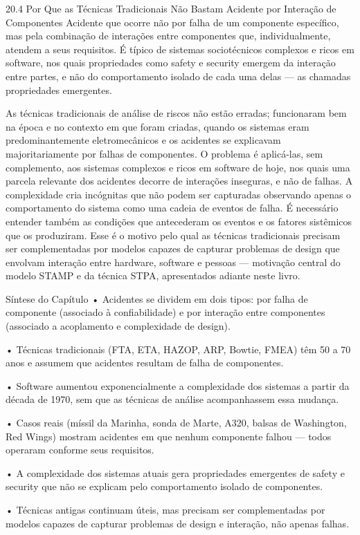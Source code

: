 20.4 Por Que as Técnicas Tradicionais Não Bastam Acidente por Interação de Componentes Acidente que ocorre não por falha de um componente específico, mas pela combinação de interações entre componentes que, individualmente, atendem a seus requisitos. É típico de sistemas sociotécnicos complexos e ricos em software, nos quais propriedades como safety e security emergem da interação entre partes, e não do comportamento isolado de cada uma delas — as chamadas propriedades emergentes.

As técnicas tradicionais de análise de riscos não estão erradas; funcionaram bem na época e no contexto em que foram criadas, quando os sistemas eram predominantemente eletromecânicos e os acidentes se explicavam majoritariamente por falhas de componentes. O problema é aplicá-las, sem complemento, aos sistemas complexos e ricos em software de hoje, nos quais uma parcela relevante dos acidentes decorre de interações inseguras, e não de falhas. A complexidade cria incógnitas que não podem ser capturadas observando apenas o comportamento do sistema como uma cadeia de eventos de falha. É necessário entender também as condições que antecederam os eventos e os fatores sistêmicos que os produziram. Esse é o motivo pelo qual as técnicas tradicionais precisam ser complementadas por modelos capazes de capturar problemas de design que envolvam interação entre hardware, software e pessoas — motivação central do modelo STAMP e da técnica STPA, apresentados adiante neste livro.

Síntese do Capítulo • Acidentes se dividem em dois tipos: por falha de componente (associado à confiabilidade) e por interação entre componentes (associado a acoplamento e complexidade de design).

• Técnicas tradicionais (FTA, ETA, HAZOP, ARP, Bowtie, FMEA) têm 50 a 70 anos e assumem que acidentes resultam de falha de componentes.

• Software aumentou exponencialmente a complexidade dos sistemas a partir da década de 1970, sem que as técnicas de análise acompanhassem essa mudança.

• Casos reais (míssil da Marinha, sonda de Marte, A320, balsas de Washington, Red Wings) mostram acidentes em que nenhum componente falhou — todos operaram conforme seus requisitos.

• A complexidade dos sistemas atuais gera propriedades emergentes de safety e security que não se explicam pelo comportamento isolado de componentes.

• Técnicas antigas continuam úteis, mas precisam ser complementadas por modelos capazes de capturar problemas de design e interação, não apenas falhas.

